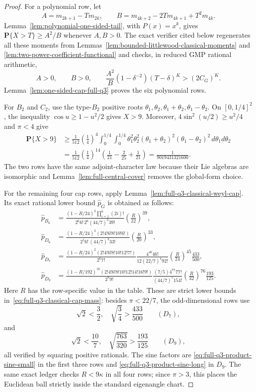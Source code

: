 \documentclass[11pt,reqno]{amsart}
\theoremstyle{plain}
\theoremstyle{definition}
\begin{document}
\begin{proof}
For a polynomial row, let
\[
 A=m_{2k+1}-Tm_{2k},\qquad
 B=m_{4k+2}-2Tm_{4k+1}+T^2m_{4k}.
\]
Lemma~\ref{lem:polynomial-one-sided-tail}, with $P(x)=x^k$, gives
$\mathbf P\{X>T\}\geq A^2/B$ whenever $A,B>0$.  The exact verifier cited
below regenerates all these moments from
Lemmas~\ref{lem:bounded-littlewood-classical-moments} and
\ref{lem:two-power-coefficient-functional} and checks, in reduced GMP
rational arithmetic,
\[
 A>0,\qquad B>0,\qquad
 \frac{A^2}{B}(1-\delta^{-2})(T-\delta)^K>(2C_G)^K.
\]
Lemma~\ref{lem:one-sided-cap-full-q3} proves the six polynomial rows.

For $B_2$ and $C_2$, use the type-$B_2$ positive roots
$\theta_1,\theta_2,\theta_1+\theta_2,\theta_1-\theta_2$.  On
$[0,1/4]^2$, the inequality $\cos u\geq1-u^2/2$ gives $X>9$.
Moreover, $4\sin^2(u/2)\geq u^2/4$ and $\pi<4$ give
\[
\begin{aligned}
 \mathbf P\{X>9\}
 &\geq\frac1{512}\left(\frac14\right)^4
 \int_0^{1/4}\!\int_0^{1/4}
 \theta_1^2\theta_2^2(\theta_1+\theta_2)^2
 (\theta_1-\theta_2)^2\,d\theta_1d\theta_2\\
 &=\frac1{512}\left(\frac14\right)^{14}
 \left(\frac1{21}-\frac2{25}+\frac1{21}\right)
 =\frac1{9019431321600}.
\end{aligned}
\]
The two rows have the same adjoint-character law because their Lie algebras
are isomorphic and Lemma~\ref{lem:full-central-cover} removes the global-form
choice.

For the remaining four cap rows, apply
Lemma~\ref{lem:full-q3-classical-weyl-cap}.  Its exact rational lower bound
$\widehat p_G$ is obtained as follows:
\[
\begin{aligned}
 \widehat p_{B_6}
 &=\frac{(1-R/24)^2\prod_{i=1}^6(2i)!}
 {2^6 6!\,2^6(44/7)^3 39!}
 \left(\frac R{22}\right)^{39},\\
 \widehat p_{D_6}
 &=\frac{(1-R/24)^2(2!4!6!8!10!6!)}
 {2^5 6!\,(44/7)^3 33!}
 \left(\frac R{20}\right)^{33},\\
 \widehat p_{D_7}
 &=\frac{(1-R/24)^2(2!4!6!8!10!12!7!)}{2^6 7!}
 \frac{4^{46}46!}{12(22/7)^4 92!}
 \left(\frac R{24}\right)^{45}\frac{433}{500},\\
 \widehat p_{D_9}
 &=\frac{(1-R/192)^{16}(2!4!6!8!10!12!14!16!9!)}{2^8 9!}
 \frac{(7/5)4^{77}77!}{(44/7)^5 154!}
 \left(\frac R{32}\right)^{76}\frac{193}{125}.
\end{aligned}
\]
Here $R$ has the row-specific value in the table.  These are strict lower
bounds in~\eqref{eq:full-q3-classical-cap-mass}: besides $\pi<22/7$, the
odd-dimensional rows use
\[
 \sqrt2<\frac32,\quad \sqrt{\frac34}>\frac{433}{500}
 \qquad(D_7),
\]
and
\[
 \sqrt2<\frac{10}{7},\quad
 \sqrt{\frac{763}{320}}>\frac{193}{125}
 \qquad(D_9),
\]
all verified by squaring positive rationals.  The sine factors are
\eqref{eq:full-q3-product-sine-small} in the first three rows and
\eqref{eq:full-q3-product-sine-long} in $D_9$.
The same exact ledger checks $R<9\kappa$ in all four rows; since
$\pi>3$, this places the Euclidean ball strictly inside the standard
eigenangle chart.


\end{proof}
\end{document}
